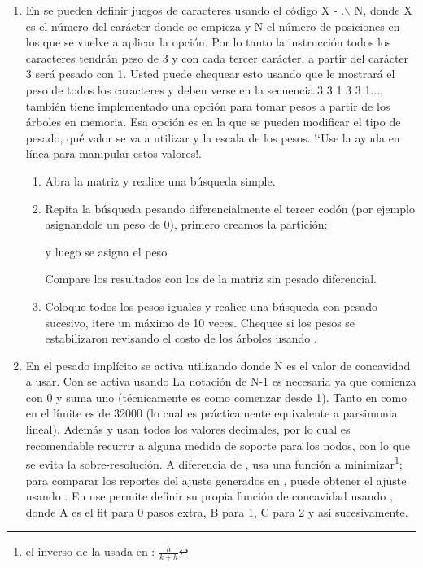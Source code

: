 \begin{enumerate}
	\item En 
	se pueden definir juegos de caracteres usando el c\'odigo X - .$\backslash$ N, donde X es el n\'umero del car\'acter donde se empieza y N el n\'umero de posiciones en los que se vuelve a aplicar la opci\'on. Por lo tanto la instrucci\'on  todos los caracteres tendr\'an peso de 3 y con  cada tercer car\'acter, a partir del car\'acter 3 ser\'a pesado con 1. Usted puede chequear esto usando  que le mostrar\'a el peso de todos los caracteres y deben verse en la secuencia 3 3 1 3 3 1...,
	tambi\'en tiene implementado una opci\'on para tomar pesos a partir de los \'arboles en memoria. Esa opci\'on es  en la que se pueden modificar el tipo de pesado, qu\'e valor se va a utilizar y la escala de los pesos. !`Use la ayuda en l\'inea para manipular estos valores!.

	\begin{enumerate}
		\item  Abra la matriz y realice una b\'usqueda simple.
		\item Repita la b\'usqueda pesando diferencialmente el tercer cod\'on (por ejemplo asignandole un peso de 0), primero creamos la partici\'on:

		y luego se asigna el peso 

		Compare los resultados con los de la matriz sin pesado diferencial.

		\item Coloque todos los pesos iguales y realice una b\'usqueda con pesado sucesivo, itere un m\'aximo de 10 veces. Chequee si los pesos se estabilizaron revisando el costo de los \'arboles usando .
	\end{enumerate}
	
	\item En  el pesado impl\'icito se activa utilizando  donde N es el valor de concavidad a usar. Con  se activa usando  La notaci\'on de N-1 es necesaria ya que  comienza con 0 y suma uno (t\'ecnicamente es como comenzar desde 1). Tanto en  como en  el l\'imite es de 32000 (lo cual es pr\'acticamente equivalente a parsimonia lineal). Adem\'as  y  usan todos los valores decimales, por lo cual es recomendable recurrir a alguna medida de soporte para los nodos, con lo que se evita la sobre-resoluci\'on. A diferencia de ,  usa una funci\'on a minimizar\footnote{el inverso de la usada en : $\frac{h}{k + h}$}; para comparar los reportes del ajuste generados en , puede obtener el ajuste usando .
	En  use 
	 permite definir su propia funci\'on de concavidad usando \cmd{piwe [A B C...;}, donde A es el fit para 0 pasos extra, B para 1, C para 2 y asi sucesivamente. 


\end{enumerate}
